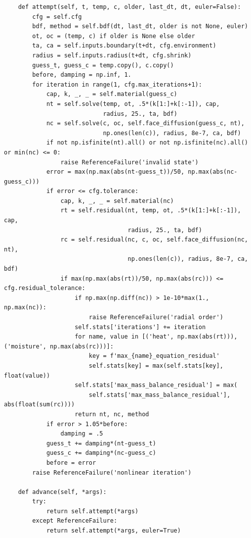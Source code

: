 \begin{verbatim}
    def attempt(self, t, temp, c, older, last_dt, dt, euler=False):
        cfg = self.cfg
        bdf, method = self.bdf(dt, last_dt, older is not None, euler)
        ot, oc = (temp, c) if older is None else older
        ta, ca = self.inputs.boundary(t+dt, cfg.environment)
        radius = self.inputs.radius(t+dt, cfg.shrink)
        guess_t, guess_c = temp.copy(), c.copy()
        before, damping = np.inf, 1.
        for iteration in range(1, cfg.max_iterations+1):
            cap, k, _, _ = self.material(guess_c)
            nt = self.solve(temp, ot, .5*(k[1:]+k[:-1]), cap,
                            radius, 25., ta, bdf)
            nc = self.solve(c, oc, self.face_diffusion(guess_c, nt),
                            np.ones(len(c)), radius, 8e-7, ca, bdf)
            if not np.isfinite(nt).all() or not np.isfinite(nc).all() or min(nc) <= 0:
                raise ReferenceFailure('invalid state')
            error = max(np.max(abs(nt-guess_t))/50, np.max(abs(nc-guess_c)))
            if error <= cfg.tolerance:
                cap, k, _, _ = self.material(nc)
                rt = self.residual(nt, temp, ot, .5*(k[1:]+k[:-1]), cap,
                                   radius, 25., ta, bdf)
                rc = self.residual(nc, c, oc, self.face_diffusion(nc, nt),
                                   np.ones(len(c)), radius, 8e-7, ca, bdf)
                if max(np.max(abs(rt))/50, np.max(abs(rc))) <= cfg.residual_tolerance:
                    if np.max(np.diff(nc)) > 1e-10*max(1., np.max(nc)):
                        raise ReferenceFailure('radial order')
                    self.stats['iterations'] += iteration
                    for name, value in [('heat', np.max(abs(rt))), ('moisture', np.max(abs(rc)))]:
                        key = f'max_{name}_equation_residual'
                        self.stats[key] = max(self.stats[key], float(value))
                    self.stats['max_mass_balance_residual'] = max(
                        self.stats['max_mass_balance_residual'], abs(float(sum(rc))))
                    return nt, nc, method
            if error > 1.05*before:
                damping = .5
            guess_t += damping*(nt-guess_t)
            guess_c += damping*(nc-guess_c)
            before = error
        raise ReferenceFailure('nonlinear iteration')

    def advance(self, *args):
        try:
            return self.attempt(*args)
        except ReferenceFailure:
            return self.attempt(*args, euler=True)


\end{verbatim}
